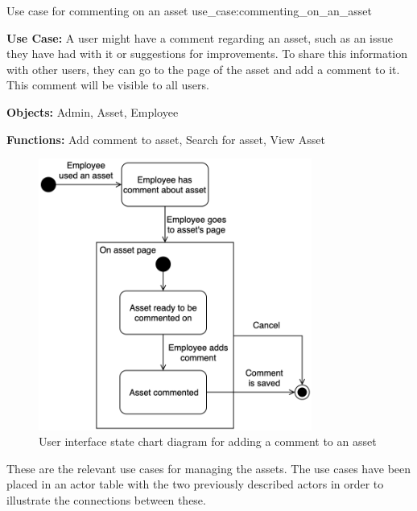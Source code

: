     {Use case for commenting on an asset}
    {use_case:commenting_on_an_asset}
    {
        \textbf{Use Case:} A user might have a comment regarding an asset, such as an issue they have had with it or suggestions for improvements. To share this information with other users, they can go to the page of the asset and add a comment to it. This comment will be visible to all users.
    
        \vskip 0.2cm
        
        \textbf{Objects:} Admin, Asset, Employee
        
        \vskip 0.2cm
        
        \textbf{Functions:} Add comment to asset, Search for asset, View Asset
    }

\begin{figure}[H]
    \centering
    \includegraphics[width=0.8\textwidth]{figures/UseCases/UC_Add_comment.png}
    \caption{User interface state chart diagram for adding a comment to an asset}
    \label{fig:add_comment_statechart}
\end{figure}

These are the relevant use cases for managing the assets. The use cases have been placed in an actor table with the two previously described actors in order to illustrate the connections between these.

